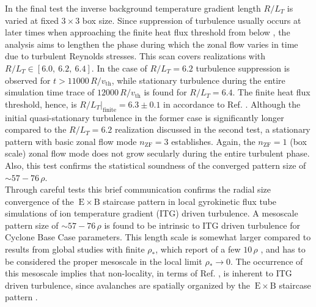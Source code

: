 \documentclass[aip, amsmath, amssymb, reprint, twocolumn, floatfix]{revtex4-1}
\newcommand{\exb}{\mathrm{\:E}\times\mathrm{B}}
\newcommand{\rlt}{R/L_T}
\newcommand{\rhoth}{\rho}
\newcommand{\vth}{v_{\mathrm{th}}}
\newcommand{\nzf}{n_\mathrm{ZF}}
\begin{document}
In the final test the inverse background temperature gradient length $\rlt$ is varied at fixed $3\times3$ box size.
Since suppression of turbulence usually occurs at later times when approaching the finite heat flux threshold from below \cite{Peeters2016}, the analysis aims to lengthen the phase during which the zonal flow varies in time due to turbulent Reynolds stresses.
This scan covers realizations with $\rlt \in [6.0,~6.2,~6.4]$.
In the case of $\rlt = 6.2$ turbulence suppression is observed for $t > 11000\,R/\vth$, while stationary turbulence during the entire simulation time trace of $12000\,R/\vth$ is found for $\rlt = 6.4$.
The finite heat flux threshold, hence, is $\rlt|_\mathrm{finite} = 6.3 \pm 0.1$ in accordance to Ref. .
Although the initial quasi-stationary turbulence in the former case is significantly longer compared to the $\rlt = 6.2$ realization discussed in the second test, a stationary pattern with basic zonal flow mode $\nzf = 3$ establishes. 
Again, the $\nzf = 1$ (box scale) zonal flow mode does not grow secularly during the entire turbulent phase.
Also, this test confirms the statistical soundness of the converged pattern size of $\sim 57 - 76\,\rhoth$. \\



Through careful tests this brief communication confirms the radial size convergence of the $\exb$ staircase pattern in local gyrokinetic flux tube simulations of ion temperature gradient (ITG) driven turbulence.
A mesoscale pattern size of $\sim 57 - 76\,\rhoth$ is found to be intrinsic to ITG driven turbulence for Cyclone Base Case parameters.
This length scale is somewhat larger compared to results from global studies with finite $\rho_\ast$, which report of a few $10\,\rhoth$ \cite{Pradalier2010}, and has to be considered the proper mesoscale in the local limit $\rho_\ast \rightarrow 0$.  
The occurrence of this mesoscale implies that non-locality, in terms of Ref. , is inherent to ITG driven turbulence, since avalanches are spatially organized by the $\exb$ staircase pattern \cite{McMillan2009, Pradalier2010, Rath2016, Peeters2016}. 
\end{document}
